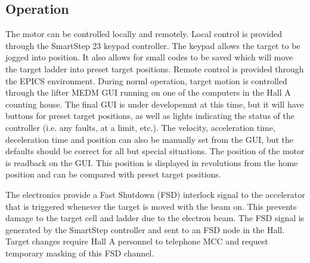 {\subsection{Operation}
        The motor can be controlled locally and remotely.  Local control
is provided through the SmartStep 23 keypad controller.  The keypad 
allows the target to be jogged into position.  It also allows for small
codes to be saved which will move the target ladder into preset target
positions.  Remote control is provided through the EPICS environment.
During norml operation, target motion is controlled through the lifter
MEDM GUI running on one of the computers in the Hall A counting house.
The final GUI is under developemnt at this time, but it will have
buttons for preset target positions, as well as lights
indicating the status of the controller (i.e. any faults, at a limit, etc.).
The velocity, acceleration time, deceleration time and position can
also be manually set from the GUI, but the defaults should be correct
for all but special situations.  The position of the motor is readback
on the GUI.  This position is displayed in revolutions from the home
position and can be compared with preset target positions.  

        The electronics provide a Fast Shutdown (FSD) interlock signal 
to the accelerator that is triggered whenever the target is moved with
the beam on.  This prevents damage to the target
cell and ladder due to the electron beam.  The FSD signal is generated
by the SmartStep controller and sent to an FSD node in the Hall.
Target changes require Hall A personnel to telephone MCC and request
temporary masking of this FSD channel.
} %
